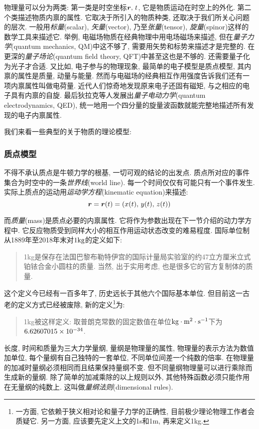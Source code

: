 物理量可以分为两类: 第一类是时空坐标$\boldsymbol{r},\,t$, 它是物质运动在时空上的外化. 第二个类描述物质内禀的属性. 它取决于所引入的物质种类, 还取决于我们所关心问题的层次. 一般用\emph{标量}(scalar), \emph{矢量}(vector), 乃至\emph{张量}(tensor), \emph{旋量}(spinor)这样的数学工具来描述它. 举例, 电磁场物质在经典物理中用电场磁场来描述, 但在\emph{量子力学}(quantum mechanics,  QM)中这不够了, 需要用矢势和标势来描述才是完整的. 在更深的\emph{量子场论}(quantum field theory,  QFT)中甚至这也是不够的. 还需要量子化为光子才合适. 又比如, 电子参与的物理现象, 最简单的电子模型是质点模型, 其内禀的属性是质量, 动量与能量. 然而与电磁场的经典相互作用强度告诉我们还有一项内禀属性叫做电荷量. 近代人们惊奇地发现原来电子还固有磁矩, 与之相应的电子具有内禀的自旋. 最后狄拉克等人发展出\emph{量子电动力学}(quantum electrodynamics, QED), 统一地用一个四分量的旋量波函数就能完整地描述所有发现的电子内禀属性.


我们来看一些典型的关于物质的理论模型:

\subsubsection{质点模型}

不得不承认质点是牛顿力学的根基, 一切可观的结论的出发点. 质点所对应的事件集合为时空中的一条\emph{世界线}(world line). 每一个时间仅仅有可能只有一个事件发生. 实际上质点的运动用\emph{运动学方程}(kinematic equation)来描述:
\[\boldsymbol{r}=\boldsymbol{r}(t)=\left(x(t),\,y(t),\,z(t)\right)\]

而\emph{质量}(mass)是质点必要的内禀属性. 它将作为参数出现在下一节介绍的动力学方程中. 它反应物质受到同样大小的相互作用运动状态改变的难易程度. 国际单位制从1889年至2018年末对$1\rm kg$的定义如下:

\begin{verse}
1kg是保存在法国巴黎布勒特伊宫的国际计量局实验室的约47立方厘米立式铂铱合金小圆柱的质量. 当然, 出于实用考虑, 也是很多它的官方复制体的质量.
\end{verse}

这个定义今已经有一百多年了, 历史远长于其他六个国际基本单位. 但目前这一古老的定义方式已经被废除, 新的定义\footnote{一方面, 它依赖于狭义相对论和量子力学的正确性, 目前极少理论物理工作者会质疑它. 另一方面, 应该要先定义上文的1s和1m, 再来定义1kg.}为:

\begin{verse}
1kg被这样定义: 取普朗克常数的固定数值在单位$\rm kg\cdot m^2\cdot s^{-1}$下为$\rm 6.62607015\times 10^{-34}$.
\end{verse}

长度, 时间和质量为三大力学量纲, 量纲是物理量的属性, 物理量的表示方法为数值加单位, 每个量纲有自己独特的一套单位, 不同单位间差一个纯数的倍率. 在物理量的加减时量纲必须相同而且结果保持量纲不变. 但不同量纲物理量可以进行乘除而生成新的量纲. 除了简单的加减乘除的以上规则以外, 其他特殊函数必须只能作用在无量纲的纯数上. 这叫做\emph{量纲法则}(dimensional rules).

